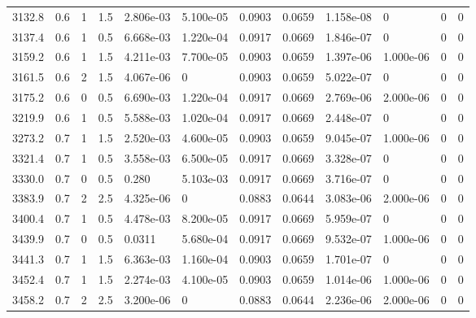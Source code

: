 \documentclass[preview]{standalone}
\begin{document}
{{{\begin{tabular}{L{1.2cm}C{1.2cm} C{0.3cm}C{0.5cm} C{1.4cm}C{1.4cm} C{1.4cm}C{1.4cm} C{1.6cm}C{1.6cm} C{1.6cm}C{1.6cm}}
  3132.8  &   0.6  & 1     & 1.5 &  2.806e-03  & 5.100e-05  &  0.0903&   0.0659& 1.158e-08 & 0   &  0 & 0  \\ 
  3137.4  &   0.6  & 1     & 0.5 &  6.668e-03  & 1.220e-04  &  0.0917&   0.0669& 1.846e-07 & 0   &  0 & 0  \\ 
  3159.2  &   0.6  & 1     & 1.5 &  4.211e-03  & 7.700e-05  &  0.0903&   0.0659& 1.397e-06 & 1.000e-06   &  0 & 0  \\ 
  3161.5  &   0.6  & 2     & 1.5 &  4.067e-06  & 0  &  0.0903&   0.0659& 5.022e-07 & 0   &  0 & 0  \\ 
  3175.2  &   0.6  & 0     & 0.5 &  6.690e-03  & 1.220e-04  &  0.0917&   0.0669& 2.769e-06 & 2.000e-06   &  0 & 0  \\ 
  3219.9  &   0.6  & 1     & 0.5 &  5.588e-03  & 1.020e-04  &  0.0917&   0.0669& 2.448e-07 & 0   &  0 & 0  \\ 
  3273.2  &   0.7  & 1     & 1.5 &  2.520e-03  & 4.600e-05  &  0.0903&   0.0659& 9.045e-07 & 1.000e-06   &  0 & 0  \\ 
  3321.4  &   0.7  & 1     & 0.5 &  3.558e-03  & 6.500e-05  &  0.0917&   0.0669& 3.328e-07 & 0   &  0 & 0  \\ 
  3330.0  &   0.7  & 0     & 0.5 &  0.280  & 5.103e-03  &  0.0917&   0.0669& 3.716e-07 & 0   &  0 & 0  \\ 
  3383.9  &   0.7  & 2     & 2.5 &  4.325e-06  & 0  &  0.0883&   0.0644& 3.083e-06 & 2.000e-06   &  0 & 0  \\ 
  3400.4  &   0.7  & 1     & 0.5 &  4.478e-03  & 8.200e-05  &  0.0917&   0.0669& 5.959e-07 & 0   &  0 & 0  \\ 
  3439.9  &   0.7  & 0     & 0.5 &  0.0311  & 5.680e-04  &  0.0917&   0.0669& 9.532e-07 & 1.000e-06   &  0 & 0  \\ 
  3441.3  &   0.7  & 1     & 1.5 &  6.363e-03  & 1.160e-04  &  0.0903&   0.0659& 1.701e-07 & 0   &  0 & 0  \\ 
  3452.4  &   0.7  & 1     & 1.5 &  2.274e-03  & 4.100e-05  &  0.0903&   0.0659& 1.014e-06 & 1.000e-06   &  0 & 0  \\ 
  3458.2  &   0.7  & 2     & 2.5 &  3.200e-06  & 0  &  0.0883&   0.0644& 2.236e-06 & 2.000e-06   &  0 & 0  \\ 
\hline 
\end{tabular} 

}}}
\end{document}
